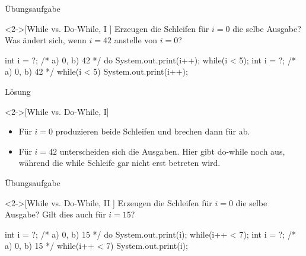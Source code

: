 \ifull
\begin{frame}[c,fragile]{Übungsaufgabe}
\begin{exercise}<2->[While vs. Do-While, I ]
    Erzeugen die Schleifen für \(i = 0\) die selbe Ausgabe?\pause{}
    Was ändert sich, wenn \(i = 42\) anstelle von \(i = 0\)?\pause
\begin{plainjava}[multicols=2,aboveskip=0pt]
int i = ?; /* a) 0, b) 42 */
do {
    System.out.print(i++);
} while(i < 5);
int i = ?; /* a) 0, b) 42 */
while(i < 5) {
    System.out.print(i++);
}
\end{plainjava}
\end{exercise}
\end{frame}

\begin{frame}[c,fragile]{Lösung}
    \begin{solve}<2->[While vs. Do-While, I]
        \begin{itemize}[<+(1)->]
        \item Für \(i = 0\) produzieren beide Schleifen  und brechen dann für  ab.
        \item Für \(i = 42\) unterscheiden sich die Ausgaben. Hier gibt do-while noch  aus, während die while Schleife gar nicht erst betreten wird.
        \end{itemize}
    \end{solve}
\end{frame}

\begin{frame}[c,fragile]{Übungsaufgabe}
    \begin{exercise}<2->[While vs. Do-While, II ]
        Erzeugen die Schleifen für \(i = 0\) die selbe Ausgabe?\pause{}
        Gilt dies auch für \(i = 15\)?\pause
    \begin{plainjava}[multicols=2,aboveskip=0pt]
int i = ?; /* a) 0, b) 15 */
do {
    System.out.print(i);
} while(i++ < 7);
int i = ?; /* a) 0, b) 15 */
while(i++ < 7) {
    System.out.print(i);
}
    \end{plainjava}
    \end{exercise}
    \end{frame}

